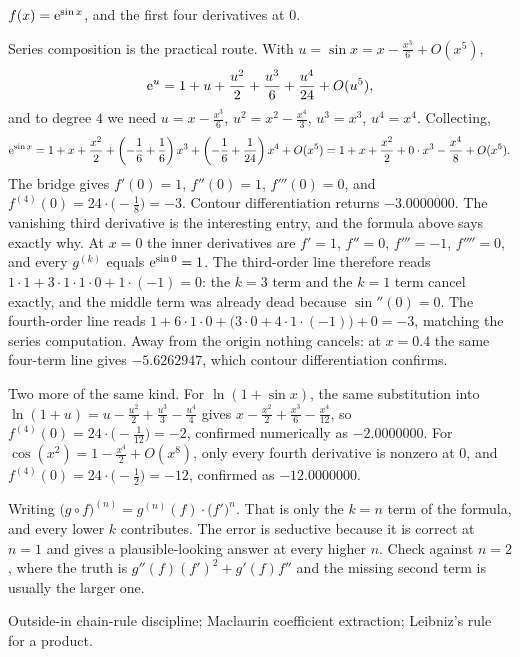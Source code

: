 \begin{worked}
$f(x)=\mathrm{e}^{\sin x}$, and the first four derivatives at $0$.

Series composition is the practical route. With $u=\sin x=x-\tfrac{x^{3}}{6}+O(x^{5})$,
\[
\mathrm{e}^{u}=1+u+\frac{u^{2}}{2}+\frac{u^{3}}{6}+\frac{u^{4}}{24}+O(u^{5}),
\]
and to degree $4$ we need $u=x-\tfrac{x^{3}}{6}$, $u^{2}=x^{2}-\tfrac{x^{4}}{3}$, $u^{3}=x^{3}$, $u^{4}=x^{4}$. Collecting,
\[
\mathrm{e}^{\sin x}=1+x+\frac{x^{2}}{2}+\left(-\frac16+\frac16\right)x^{3}+\left(-\frac16+\frac1{24}\right)x^{4}+O(x^{5})
=1+x+\frac{x^{2}}{2}+0\cdot x^{3}-\frac{x^{4}}{8}+O(x^{5}).
\]
The bridge gives $f'(0)=1$, $f''(0)=1$, $f'''(0)=0$, and $f^{(4)}(0)=24\cdot\bigl(-\tfrac18\bigr)=-3$. Contour differentiation returns $-3.0000000$. The vanishing third derivative is the interesting entry, and the formula above says exactly why. At $x=0$ the inner derivatives are $f'=1$, $f''=0$, $f'''=-1$, $f''''=0$, and every $g^{(k)}$ equals $\mathrm{e}^{\sin0}=1$. The third-order line therefore reads $1\cdot1+3\cdot1\cdot1\cdot0+1\cdot(-1)=0$: the $k=3$ term and the $k=1$ term cancel exactly, and the middle term was already dead because $\sin''(0)=0$. The fourth-order line reads $1+6\cdot1\cdot0+\bigl(3\cdot0+4\cdot1\cdot(-1)\bigr)+0=-3$, matching the series computation. Away from the origin nothing cancels: at $x=0.4$ the same four-term line gives $-5.6262947$, which contour differentiation confirms.

Two more of the same kind. For $\ln(1+\sin x)$, the same substitution into $\ln(1+u)=u-\tfrac{u^{2}}{2}+\tfrac{u^{3}}{3}-\tfrac{u^{4}}{4}$ gives $x-\tfrac{x^{2}}{2}+\tfrac{x^{3}}{6}-\tfrac{x^{4}}{12}$, so $f^{(4)}(0)=24\cdot\bigl(-\tfrac1{12}\bigr)=-2$, confirmed numerically as $-2.0000000$. For $\cos(x^{2})=1-\tfrac{x^{4}}{2}+O(x^{8})$, only every fourth derivative is nonzero at $0$, and $f^{(4)}(0)=24\cdot\bigl(-\tfrac12\bigr)=-12$, confirmed as $-12.0000000$.
\end{worked}

\begin{trap}
Writing $\bigl(g\circ f\bigr)^{(n)}=g^{(n)}(f)\cdot\bigl(f'\bigr)^{n}$. That is only the $k=n$ term of the formula, and every lower $k$ contributes. The error is seductive because it is correct at $n=1$ and gives a plausible-looking answer at every higher $n$. Check against $n=2$, where the truth is $g''(f)(f')^{2}+g'(f)f''$ and the missing second term is usually the larger one.
\end{trap}

\begin{seealsob}Outside-in chain-rule discipline; Maclaurin coefficient extraction; Leibniz's rule for a product.\end{seealsob}

